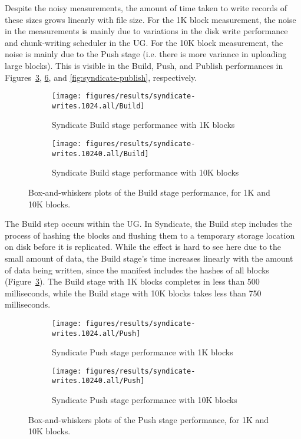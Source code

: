Despite the noisy measurements, the amount of time taken to write records of
these sizes grows linearly with file size.  For the 1K block measurement, the noise in the
measurements is mainly due to variations in the disk write performance and
chunk-writing scheduler in the UG.  For the 10K block measurement, the noise is
mainly due to the Push stage (i.e. there is more variance in uploading large
blocks).  This is visible in the Build, Push, and Publish
performances in Figures~\ref{fig:syndicate-build}, \ref{fig:syndicate-push}, and
\ref{fig:syndicate-publish}, respectively.

\begin{figure}[htp!]
   \centering
   \begin{subfigure}[b]{.8\textwidth}
      \texttt{[image: figures/results/syndicate-writes.1024.all/Build]}
      \label{fig:syndicate-build-1k}
      \caption{Syndicate Build stage performance with 1K blocks}
   \end{subfigure}
   \begin{subfigure}[b]{.8\textwidth}
      \texttt{[image: figures/results/syndicate-writes.10240.all/Build]}
      \label{fig:syndicate-build-10k}
      \caption{Syndicate Build stage performance with 10K blocks}
   \end{subfigure}
   \caption{Box-and-whiskers plots of the Build stage performance, for 1K and
   10K blocks.}
   \label{fig:syndicate-build}
\end{figure}

The Build step occurs within the UG.  In Syndicate, the Build step includes the
process of hashing the blocks and flushing them to a temporary storage location on
disk before it is replicated.  While the effect is hard to see here due to the 
small amount of data, the Build stage's time increases linearly with the amount
of data being written, since the manifest includes the hashes of all blocks
(Figure~\ref{fig:syndicate-build}).  The Build stage with 1K blocks completes in
less than 500 milliseconds, while the Build stage with 10K blocks takes less
than 750 milliseconds.

\begin{figure}[htp!]
   \centering
   \begin{subfigure}[b]{.8\textwidth}
      \texttt{[image: figures/results/syndicate-writes.1024.all/Push]}
      \label{fig:syndicate-push-1k}
      \caption{Syndicate Push stage performance with 1K blocks}
   \end{subfigure}
   \begin{subfigure}[b]{.8\textwidth}
      \texttt{[image: figures/results/syndicate-writes.10240.all/Push]}
      \label{fig:syndicate-push-10k}
      \caption{Syndicate Push stage performance with 10K blocks}
   \end{subfigure}
   \caption{Box-and-whiskers plots of the Push stage performance, for 1K and
   10K blocks.}
   \label{fig:syndicate-push}
\end{figure}

